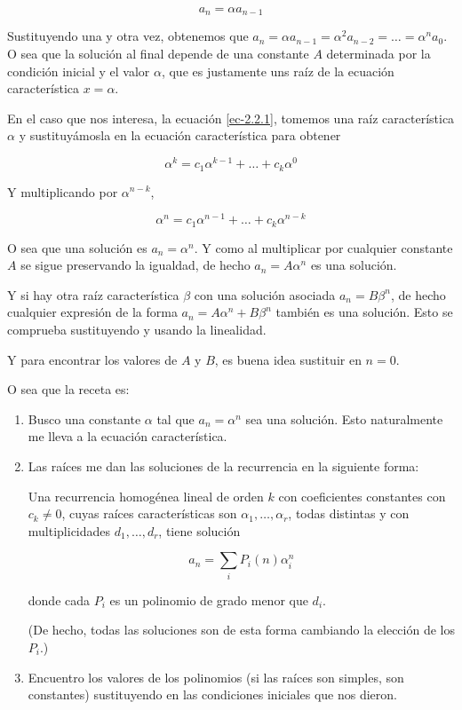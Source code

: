 $$
a_n=\alpha a_{n-1}
$$

Sustituyendo una y otra vez, obtenemos que
$a_n = \alpha a_{n-1} = \alpha^2a_{n-2} =
\ldots = \alpha^na_0$. O sea que la solución
al final depende de una constante $A$
determinada por la condición inicial y el
valor $\alpha$, que es justamente uns raíz de
la ecuación característica $x = \alpha$.

En el caso que nos interesa, la ecuación
\eqref{ec-2.2.1}, tomemos una raíz
característica $\alpha$ y sustituyámosla en
la ecuación característica para obtener

$$
\alpha^k=c_1\alpha^{k-1}+\ldots+c_k\alpha^{0}
$$

Y multiplicando por $\alpha^{n-k}$,

$$
\alpha^n = c_1\alpha^{n-1} +  \ldots +
c_k\alpha^{n-k}
$$

O sea que una solución es $a_n = \alpha^n$. Y
como al multiplicar por cualquier constante
$A$ se sigue preservando la igualdad, de
hecho $a_n = A\alpha^n$ es una solución.

Y si hay otra raíz característica $\beta$ con
una solución asociada $a_n = B\beta^n$, de
hecho cualquier expresión de la forma $a_n =
A\alpha^n + B\beta^n$ también es una
solución. Esto se comprueba sustituyendo y
usando la linealidad.

Y para encontrar los valores de $A$ y $B$, es
buena idea sustituir en $n = 0$.

O sea que la receta es:
\begin{enumerate}
\item Busco una constante $\alpha$ tal que
$a_n = \alpha^n$ sea una solución. Esto
naturalmente me lleva a la ecuación
característica.
\item Las raíces me dan las soluciones de la
recurrencia en la siguiente forma:
\begin{theorem}
\label{theorem-combi-001}
Una recurrencia homogénea lineal de orden $k$
con coeficientes constantes con $c_k\neq0$,
cuyas raíces características son $\alpha_1,
\ldots,\alpha_r$, todas distintas y con
multiplicidades $d_1, \ldots,d_r$, tiene
solución

$$
a_n=\sum_iP_i(n)\alpha_i^n
$$

donde cada $P_i$ es un polinomio de grado
menor que $d_i$.
\end{theorem}
(De hecho, todas las soluciones son de esta
forma cambiando la elección de los $P_i$.)
\item Encuentro los valores de los polinomios
(si las raíces son simples, son constantes)
sustituyendo en las
condiciones iniciales que nos dieron.
\end{enumerate}

